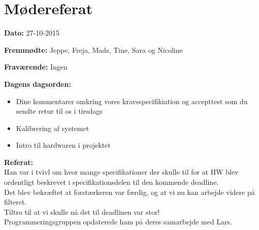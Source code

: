 \chapter{Mødereferat}

\textbf{Dato:} 27-10-2015

\textbf{Fremmødte:} Jeppe, Freja, Mads, Tine, Sara og Nicoline

\textbf{Fraværende:} Ingen

\textbf{Dagens dagsorden:}
\begin{itemize}
	\item Dine kommentarer omkring vores kravsspecifikiation og accepttest som du sendte retur til os i tirsdags
	\item Kalibrering af systemet
    \item Intro til hardwaren i projektet\\
\end{itemize}

\textbf{Referat:}
\\ Han var i tvivl om hvor mange specifikationer der skulle til for at HW blev ordentligt beskrevet i specifikationsdelen til den kommende deadline. 
\\ Det blev bekræftet at forstærkeren var færdig, og at vi nu kan arbejde videre på filteret. 
\\Tiltro til at vi skulle nå det til deadlinen var stor! 
\\Programmeringsgruppen opdaterede ham på deres samarbejde med Lars. 